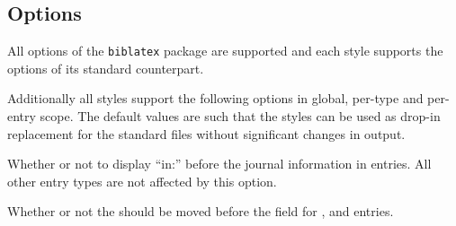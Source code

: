 \documentclass[DIV=9]{scrartcl}
\def\sty{\texttt}
\begin{document}
\subsection{Options}
All options of the \sty{biblatex} package are supported and each style supports
the options of its standard counterpart.

Additionally all styles support the following options in global, per-type and
per-entry scope.
The default values are such that the styles can be used as drop-in replacement
for the standard files without significant changes in output.

\begin{optionlist}
Whether or not to display \enquote{in:} before the journal information in
 entries.
All other entry types are not affected by this option.

\begin{bibexample}[title={\kvopt{articlein}{true}}]
\makeatletter
\togglefalse{bbx:doi}
\toggletrue{bbx:articlein}
\smallskip\par{}
\makeatother
\end{bibexample}

\begin{bibexample}[title={\kvopt{articlein}{false}}]
\togglefalse{bbx:doi}
\togglefalse{bbx:articlein}
\makeatletter
{}
\smallskip\par{}
\makeatother
\end{bibexample}

Whether or not the  should be moved before the
 field for ,  and
 entries.



\end{optionlist}
\end{document}
